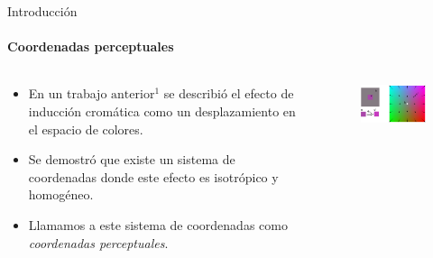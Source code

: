 \documentclass[
    11pt, %
    aspectratio=169, %
]{beamer}
\begin{document}
\begin{frame}{Introducción}
	\framesubtitle{Coordenadas perceptuales}

  \begin{columns}[c] %

    
		\begin{column}{0.45\textwidth} %
                \begin{itemize}
                    \item {} En un trabajo $\text{anterior}^1$ se describió el efecto de inducción cromática como un desplazamiento en el espacio de colores.
                    \item {} Se demostró que existe un sistema de coordenadas donde este efecto es isotrópico y homogéneo. 
                    \item {}Llamamos a este sistema de coordenadas como  \emph{coordenadas perceptuales}.
                \end{itemize}
        
               
		\end{column}
  		\begin{column}{0.55\textwidth} %

                \begin{figure}
                    \centering
                    \includegraphics[width = 7cm]{Images/intro/repulsion.pdf}
                \end{figure}
                
		\end{column}		
	\end{columns}

        
        
\end{frame}
\end{document}
